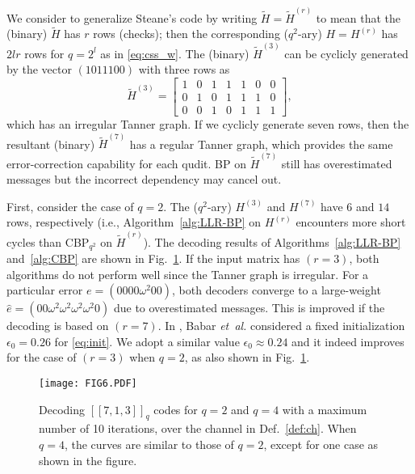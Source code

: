 \documentclass{ieeeaccess}
\theoremstyle{definition}		%
\begin{document}
We consider to generalize Steane's code by writing ${ \tilde H = \tilde H^{(r)} }$ to mean that the (binary) $\tilde H$ has $r$ rows (checks); 
	then the corresponding ($q^2$-ary) $H = H^{(r)}$ has $2lr$ rows for $q=2^l$ as in \eqref{eq:css_w}.
The (binary) $\tilde H^{(3)}$ can be cyclicly generated by the vector $(1011100)$ with three rows as
	$$ \tilde H^{(3)} = 
	\left[ \begin{smallmatrix}
	1 & 0 & 1 & 1 & 1 & 0 & 0 \\
	0 & 1 & 0 & 1 & 1 & 1 & 0 \\
	0 & 0 & 1 & 0 & 1 & 1 & 1
	\end{smallmatrix}\right],
	$$
which has an irregular Tanner graph.
%
If we cyclicly generate seven rows, then the resultant (binary) $\tilde H^{(7)}$ has a regular Tanner graph, 
which provides the same error-correction capability for each qudit. %
BP on $\tilde H^{(7)}$ still has overestimated messages but the incorrect dependency may cancel out.



First, consider the case of $q=2$. 
The ($q^2$-ary) $H^{(3)}$ and $H^{(7)}$ have $6$ and $14$ rows, respectively (i.e., Algorithm~\ref{alg:LLR-BP} on $H^{(r)}$ 
encounters more short cycles than CBP$_{q^2}$ on $\tilde H^{(r)}$).
The decoding results of Algorithms~\ref{alg:LLR-BP} and~\ref{alg:CBP} are shown in Fig.~\ref{fig:713_2}.
If the input matrix has $(r=3)$, both algorithms do not perform well since the Tanner graph is irregular.
	For a particular error $e=(0 0 0 0 \omega^2 0 0)$, both decoders converge to a large-weight $\hat e = (0 0 \omega^2 \omega^2 \omega^2 \omega^2 0)$ due to overestimated messages.
	This is improved if the decoding is based on $(r=7)$. 
In \cite{Bab+15}, Babar {\it et~al.} considered a fixed initialization $\epsilon_0=0.26$ for \eqref{eq:init}. 
We adopt a similar value $\epsilon_0\approx 0.24$ and it indeed improves for the case of $(r=3)$ when $q=2$, as also shown in Fig.~\ref{fig:713_2}.



\begin{figure} 
	\centering \texttt{[image: FIG6.PDF]}
	\caption{
		Decoding $[[7,1,3]]_q$ codes for $q=2$ and $q=4$ with a maximum number of 10 iterations, over the channel in Def.~\ref{def:ch}.
		When $q=4$, the curves are similar to those of $q=2$, except for one case as shown in the figure.
	} \label{fig:713_2}
\end{figure}
\end{document}
